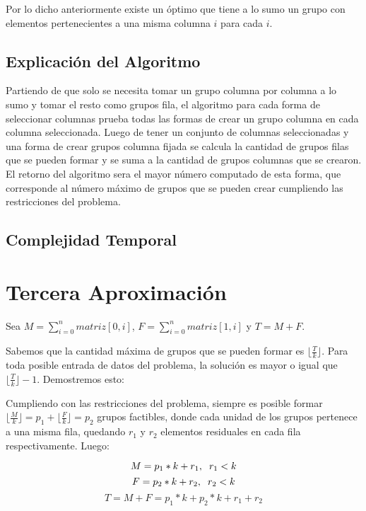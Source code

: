 \documentclass[article]{llncs}
\begin{document}
Por lo dicho anteriormente existe un \'optimo que tiene a lo sumo un grupo con elementos pertenecientes a una misma columna $i$
para cada $i$.

\subsection{Explicaci\'on del Algoritmo}

Partiendo de que solo se necesita tomar un grupo columna por columna a lo sumo y 
tomar el resto como grupos fila, el algoritmo para cada forma de seleccionar 
columnas prueba todas las formas de crear un grupo columna en cada columna seleccionada. 
Luego de tener un conjunto de columnas seleccionadas y una forma de crear grupos columna fijada se 
calcula la cantidad de grupos filas que se pueden formar y se suma a la cantidad de grupos columnas 
que se crearon. El retorno del algoritmo sera el mayor n\'umero computado de esta forma, que corresponde
al n\'umero máximo de grupos que se pueden crear cumpliendo las restricciones del problema.

\subsection{Complejidad Temporal}



\section{Tercera Aproximaci\'on}

Sea $M = \sum_{i=0}^{n}matriz[0, i]$, $F = \sum_{i=0}^{n}matriz[1, i]$ y 
$T = M + F$.

Sabemos que la cantidad máxima de grupos que se pueden formar es $\lfloor \frac{T}{k} \rfloor$.
Para toda posible entrada de datos del problema, la solución es mayor o igual que 
$\lfloor \frac{T}{k} \rfloor - 1$. Demostremos esto: 

%

Cumpliendo con las restricciones del problema, siempre es posible formar 
$\lfloor \frac{M}{k}\rfloor=p_1  + \lfloor \frac{F}{k}\rfloor=p_2 $ grupos factibles, 
donde cada unidad de los grupos pertenece a una misma fila, quedando $r_1$ y 
$r_2$ elementos residuales en cada fila respectivamente. Luego:

$$M = p_1 * k + r_1, \hspace{0,2 cm} r_1 < k$$
$$F = p_2 * k + r_2, \hspace{0,2 cm} r_2 < k$$
$$T = M + F = p_1 * k + p_2*k + r_1 + r_2$$
\end{document}
